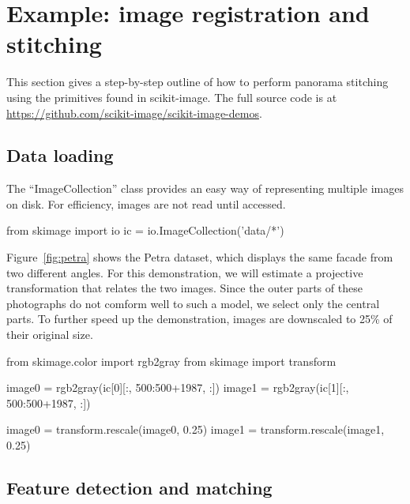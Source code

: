 
\section*{Example: image registration and stitching}
  \label{sec:example-image-registration-and-stitching}

  This section gives a step-by-step outline of how to perform panorama stitching using the primitives found in scikit-image. The full source code is at \url{https://github.com/scikit-image/scikit-image-demos}.

  \subsection{Data loading}
    \label{sub:data_loading}

    The ``ImageCollection'' class provides an easy way of representing multiple images on disk. For efficiency, images are not read until accessed.

    \begin{pyverbatim}
      from skimage import io
      ic = io.ImageCollection('data/*')
    \end{pyverbatim}

    Figure~\ref{fig:petra} shows the Petra dataset, which displays the same facade from two different angles. For this demonstration, we will estimate a projective transformation that relates the two images. Since the outer parts of these photographs do not comform well to such a model, we select only the central parts. To further speed up the demonstration, images are downscaled to 25\% of their original size.

    \begin{pyverbatim}
      from skimage.color import rgb2gray
      from skimage import transform

      image0 = rgb2gray(ic[0][:, 500:500+1987, :])
      image1 = rgb2gray(ic[1][:, 500:500+1987, :])

      image0 = transform.rescale(image0, 0.25)
      image1 = transform.rescale(image1, 0.25)
    \end{pyverbatim}

  \subsection{Feature detection and matching}
    \label{sub:feature_detection_and_matching}

